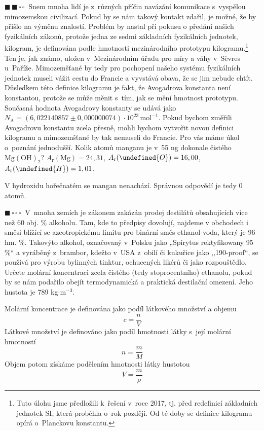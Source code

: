 \documentclass{book}
\let\ch\undefined
\newcommand{\jeden}{$\blacksquare \, \square \, \square \, \square \; \; $}
\newcommand{\dva}{$\blacksquare \, \blacksquare \, \square \, \square \; \; $}
\renewenvironment{quotation}{\par}{\par} %
\begin{document}
\hrulefill %
\begin{quotation}
\dva Snem mnoha lidí je z~různých příčin navázání komunikace s~vyspělou
mimozemskou civilizací. Pokud by se nám takový kontakt zdařil, je
možné, že by přišlo na výměnu znalostí. Problém by nastal při pokusu
o předání našich fyzikálních zákonů, protože jedna ze sedmi základních
fyzikálních jednotek, kilogram, je definována podle hmotnosti mezinárodního
prototypu kilogramu.\footnote{Tuto úlohu jsme předložili k~řešení v~roce 2017, tj. před redefinicí základních jednotek SI, která proběhla o~rok později. Od té doby se definice kilogramu opírá o~Planckovu konstantu.
} Ten je, jak známo, uložen v~Mezinárodním úřadu
pro míry a váhy v~Sèvres u~Paříže. Mimozemšťané by tedy pro pochopení
našeho systému fyzikálních jednotek museli vážit cestu do Francie
a vyvstává obava, že se jim nebude chtít. Důsledkem této definice
kilogramu je fakt, že Avogadrova konstanta není konstantou, protože
se může měnit s~tím, jak se mění hmotnost prototypu. Současná hodnota
Avogadrovy konstanty se udává jako $N_{\mathrm{A}}=(6,022140857\pm0,000000074)\cdot10^{23}\, \mathrm{mol^{-1}}$.
Pokud bychom změřili Avogadrovu konstantu zcela přesně, mohli bychom
vytvořit novou definici kilogramu a mimozemšťané by tak nemuseli do
Francie. Pro vás máme úkol o~poznání jednodušší. Kolik atomů manganu
je v~55 ng dokonale čistého $\mathrm{Mg(OH)_{2}}$? 
$A_\mathrm{r} (\mathrm{Mg}) = 24,31$, $A_\mathrm{r} (\ch{O}) = 16,00$, $A_\mathrm{r} (\ch{H}) = 1,01$.
\end{quotation} \dotfill \par 
V hydroxidu hořečnatém se mangan nenachází. Správnou odpovědí je tedy
0 atomů.

\hrulefill %
\begin{quotation}
\jeden V~mnoha zemích je zákonem zakázán prodej destilátů obsahujících více
než 60 obj. \% alkoholu. Tam, kde to předpisy dovolují, najdeme v
obchodech i směsi blížící se azeotropickému limitu pro binární směs
ethanol-voda, který je 96 hm. \%. Takovýto alkohol, označovaný v~Polsku
jako „Spirytus rektyfikowany 95 \%`` a vyráběný z~brambor, kdežto
v~USA z~obilí či kukuřice jako ,,190-proof``, se používá pro výrobu
bylinných tinktur, ochucených likérů či jako rozpouštědlo. Určete
molární koncentraci zcela čistého (tedy stoprocentního) ethanolu,
pokud by se nám podařilo obejít termodynamická a praktická destilační
omezení. Jeho hustota je 789 kg$\cdot$m$^{-3}$.
\end{quotation} \dotfill \par 
Molární koncentrace je definována jako podíl látkového množství a
objemu 
\[
c=\frac{n}{V}
\]
Látkové množství je definováno jako podíl hmotnosti látky s~její
molární hmotností 
\[
n=\frac{m}{M}
\]
Objem potom získáme podělením hmotnosti látky hustotou 
\[
V=\frac{m}{\rho}
\]
\end{document}
